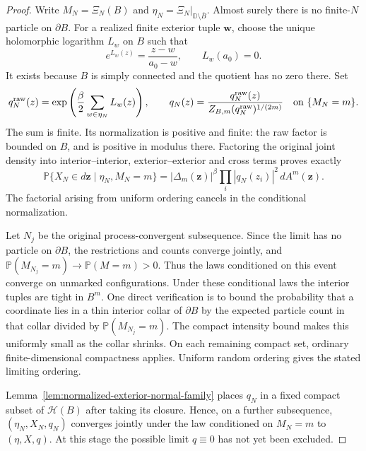 \documentclass[11pt,a4paper]{article}
\numberwithin{equation}{section}
\theoremstyle{definition}
\theoremstyle{remark}
\newcommand{\D}{\mathbb D}
\begin{document}
\begin{proof}
Write $M_N=\Xi_N(B)$ and $\eta_N=\Xi_N|_{\D\setminus\overline B}$.
Almost surely there is no finite-$N$ particle on $\partial B$.
For a realized finite exterior tuple $\mathbf w$, choose the unique
holomorphic logarithm $L_w$ on $B$ such that
\[
 e^{L_w(z)}=\frac{z-w}{a_0-w},\qquad L_w(a_0)=0.
\]
It exists because $B$ is simply connected and the quotient has no zero
there. Set
\[
 q_N^{\rm raw}(z)=
       \exp\left(\frac\beta2\sum_{w\in\eta_N}L_w(z)\right),\qquad
 q_N(z)=\frac{q_N^{\rm raw}(z)}
              {Z_{B,m}(q_N^{\rm raw})^{1/(2m)}}
 \quad\hbox{on }\{M_N=m\}.
\]
The sum is finite. Its normalization is positive and finite: the raw
factor is bounded on $B$, and is positive in modulus there. Factoring
the original joint density into interior--interior, exterior--exterior
and cross terms proves exactly
\begin{equation}\label{eq:finite-normalized-exterior-kernel}
 \mathbb P\{X_N\in d\mathbf z\mid\eta_N,M_N=m\}
   =|\Delta_m(\mathbf z)|^\beta
                        \prod_i|q_N(z_i)|^2\,dA^m(\mathbf z).
\end{equation}
The factorial arising from uniform ordering cancels in the conditional
normalization.

Let $N_j$ be the original process-convergent subsequence. Since the
limit has no particle on $\partial B$, the restrictions and counts
converge jointly, and
$\mathbb P(M_{N_j}=m)\to\mathbb P(M=m)>0$. Thus the laws conditioned
on this event converge on unmarked configurations. Under these
conditional laws the interior tuples are tight in $B^m$. One direct
verification is to bound the probability that a coordinate lies in a
thin interior collar of $\partial B$ by the expected particle count
in that collar divided by $\mathbb P(M_{N_j}=m)$. The compact intensity
bound makes this uniformly small as the collar shrinks. On each
remaining compact set, ordinary finite-dimensional compactness applies.
Uniform random ordering gives the stated limiting ordering.

Lemma~\ref{lem:normalized-exterior-normal-family} places $q_N$ in a
fixed compact subset of $\mathcal H(B)$ after taking its closure.
Hence, on a further subsequence, $(\eta_N,X_N,q_N)$ converges jointly
under the law conditioned on $M_N=m$ to $(\eta,X,q)$. At this stage
the possible limit $q\equiv0$ has not yet been excluded.


\end{proof}
\end{document}
